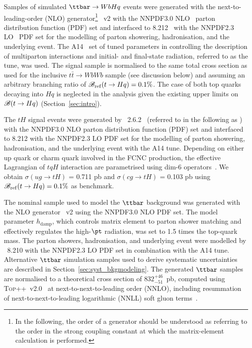 Samples of simulated $\ttbar \to WbHq$ events were generated with the next-to-leading-order (NLO) generator\footnote{In the following, 
the order of a generator should be understood as referring to the order in the strong coupling constant at which the matrix-element calculation 
is performed.} {\powheg}~v2 \cite{Frixione:2007nw,Nason:2004rx,Frixione:2007vw,Alioli:2010xd}
with the NNPDF3.0 NLO~\cite{Ball:2014uwa} parton distribution function (PDF) set and interfaced to {\pythia} 8.212~\cite{Sjostrand:2007gs} with the NNPDF2.3 LO~\cite{Ball:2012cx} PDF set for the modelling of parton showering, hadronisation, and the underlying event. 
The A14~\cite{ATLASUETune4} set of tuned parameters in {\pythia} controlling the description of multiparton interactions and  
initial- and final-state radiation, referred to as the tune, was used.
The signal sample is normalised to the same total cross section as used for the inclusive $t\bar{t}\to WbWb$ sample (see discussion below) and
assuming an arbitrary branching ratio of $\mathscr{B}_{\mathrm{ref}}(t\to Hq)=0.1\%$.
The case of both top quarks decaying into $Hq$ is neglected in the analysis given the existing upper limits on $\mathscr{B}(t \to Hq)$ (Section~\ref{sec:intro}).

The $tH$ signal events were generated by {\amcatnlolong}~2.6.2~\cite{Alwall:2014hca}  (referred to in the following as {\amcatnlo})
with the NNPDF3.0 NLO parton distribution function (PDF) set and interfaced to {\pythia} 8.212 with the NNPDF2.3 LO PDF set for the modelling of parton showering,
hadronisation, and the underlying event with the A14 tune.
Depending on either up quark or charm quark involved in the FCNC production, the effective Lagrangian of $tqH$ interaction are parametrised using
dim-6 operators~\cite{fcnc_production_theory}. We obtain $\sigma(ug\to tH)$ = 0.711 pb and $\sigma(cg\to tH)$ = 0.103 pb using $\mathscr{B}_{\mathrm{ref}}(t\to Hq)=0.1\%$ as benchmark.   

The nominal sample used to model the $\ttbar$ background was generated with the NLO generator {\powheg}~v2
using the NNPDF3.0 NLO PDF set. The {\powheg} model parameter $h_{\textrm{damp}}$, which controls 
matrix element to parton shower matching and effectively regulates the high-$\pt$ radiation, was set to 1.5 times the top-quark mass. 
The parton showers, hadronisation, and underlying event were modelled by {\pythia}~8.210 with the NNPDF2.3 LO PDF set in combination with the A14 tune.
Alternative $\ttbar$ simulation samples used to derive systematic uncertainties are described in Section~\ref{sec:syst_bkgmodeling}. 
The generated $\ttbar$ samples are normalised to a theoretical cross section of $832^{+46}_{-51}$~pb, 
computed using \textsc{Top++}~v2.0~\cite{Czakon:2011xx} at next-to-next-to-leading order (NNLO), 
including resummation of next-to-next-to-leading logarithmic (NNLL) soft gluon 
terms~\cite{Cacciari:2011hy,Baernreuther:2012ws,Czakon:2012zr,Czakon:2012pz,Czakon:2013goa}.

